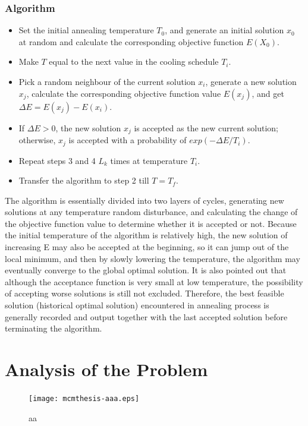 \documentclass{mcmthesis}
\begin{document}
\subsubsection{Algorithm}
\begin{itemize}
	\item Set the initial annealing temperature $T_0$, and generate an initial solution $x_0$ at random and calculate the corresponding objective function $E(X_0)$.
	\item Make $T$ equal to the next value in the cooling schedule $T_i$.
	\item Pick a random neighbour of the current solution $x_i$, generate a new solution $x_j$, calculate the corresponding objective function value $E(x_j)$, and get $\Delta E=E(x_j)-E(x_i)$.
	\item If  $\Delta E > 0$, the new solution $x_j$ is accepted as the new current solution; otherwise, $x_j$ is accepted with a probability of $exp(-\Delta E/T_i)$. 
	\item Repeat steps 3 and 4 $L_k$ times at temperature $T_i$.
	\item Transfer the algorithm  to step 2 till $T=T_f$.
\end{itemize}
The algorithm is essentially divided into two layers of cycles, generating new solutions at any temperature random disturbance, and calculating the change of the objective function value to determine whether it is accepted or not. Because the initial temperature of the algorithm is relatively high, the new solution of increasing E may also be accepted at the beginning, so it can jump out of the local minimum, and then by slowly lowering the temperature, the algorithm may eventually converge to the global optimal solution. It is also pointed out that although the acceptance function is very small at low temperature, the possibility of accepting worse solutions is still not excluded. Therefore, the best feasible solution (historical optimal solution) encountered in annealing process is generally recorded and output together with the last accepted solution before terminating the algorithm.






\section{Analysis of the Problem}
\begin{figure}[h]
\small
\centering
\texttt{[image: mcmthesis-aaa.eps]}
\caption{aa} \label{fig:aa}
\end{figure}
\end{document}
